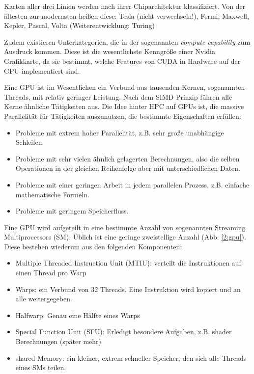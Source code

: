         Karten aller drei Linien werden nach ihrer Chiparchitektur klassifiziert. Von der ältesten zur modernsten heißen diese: Tesla (nicht verwechseln!), Fermi, Maxwell, Kepler, Pascal, Volta (Weiterentwicklung: Turing)
        
        Zudem existieren Unterkategorien, die in der sogenannten \textit{\gls{compute capability}} zum Ausdruck kommen. Diese ist die wesentlichste Kenngröße einer Nvidia Grafikkarte, da sie bestimmt, welche Features von CUDA in Hardware auf der GPU implementiert sind.		
		
		Eine GPU ist im Wesentlichen ein Verbund aus tausenden Kernen, sogenannten \Glspl{Thread}, mit relativ geringer Leistung. Nach dem SIMD Prinzip führen alle Kerne ähnliche Tätigkeiten aus. Die Idee hinter HPC auf GPUs ist, die massive Parallelität für Tätigkeiten auszunutzen, die bestimmte Eigenschaften erfüllen:
		\begin{itemize}
			\item Probleme mit extrem hoher Parallelität, z.B. sehr große unabhängige Schleifen.
			\item Probleme mit sehr vielen ähnlich gelagerten Berechnungen, also die selben Operationen in der gleichen Reihenfolge aber mit unterschiedlichen Daten.
			\item Probleme mit einer geringen \Gls{Arbeit} in jedem parallelen Prozess, z.B. einfache mathematische Formeln.
			\item Probleme mit geringem Speicherfluss.			
		\end{itemize}

		Eine GPU wird aufgeteilt in eine bestimmte Anzahl von sogenannten Streaming Multiprocessors (\Gls{SM}). Üblich ist eine geringe zweistellige Anzahl (Abb. \ref{2:gpu}). Diese bestehen wiederum aus den folgenden Komponenten:
		
		\begin{itemize}
	        	\item Multiple Threaded Instruction Unit (\Gls{MTIU}): verteilt die Instruktionen auf einen \Gls{Thread} pro \Gls{Warp}
        		\item \Glspl{Warp}: ein Verbund von 32 \Glspl{Thread}. Eine Instruktion wird kopiert und an alle weitergegeben.
		    \item \Gls{Halfwarp}: Genau eine Hälfte eines \glspl{Warp}
		    \item Special Function Unit (SFU): Erledigt besondere Aufgaben, z.B. shader Berechnungen (später mehr) 
        		\item \Gls{shared Memory}: ein kleiner, extrem schneller Speicher, den sich alle \Glspl{Thread} eines \Gls{SM}s teilen.
		\end{itemize}
		
